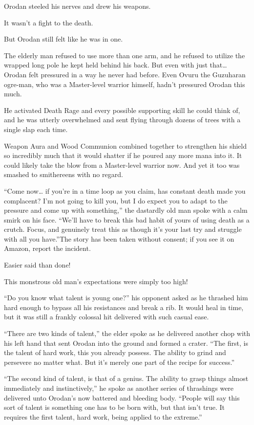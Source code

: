 \documentclass[a4paper,10pt]{book}
\begin{document}
Orodan steeled his nerves and drew his weapons.\par
\par
It wasn’t a fight to the death.\par
But Orodan still felt like he was in one.\par
The elderly man refused to use more than one arm, and he refused to utilize the wrapped long pole he kept held behind his back. But even with just that… Orodan felt pressured in a way he never had before. Even Ovuru the Guzuharan ogre-man, who was a Master-level warrior himself, hadn’t pressured Orodan this much.\par
He activated Death Rage and every possible supporting skill he could think of, and he was utterly overwhelmed and sent flying through dozens of trees with a single slap each time.\par
Weapon Aura and Wood Communion combined together to strengthen his shield so incredibly much that it would shatter if he poured any more mana into it. It could likely take the blow from a Master-level warrior now. And yet it too was smashed to smithereens with no regard.\par
“Come now… if you're in a time loop as you claim, has constant death made you complacent? I’m not going to kill you, but I do expect you to adapt to the pressure and come up with something,” the dastardly old man spoke with a calm smirk on his face. “We’ll have to break this bad habit of yours of using death as a crutch. Focus, and genuinely treat this as though it’s your last try and struggle with all you have.”The story has been taken without consent; if you see it on Amazon, report the incident.\par
Easier said than done!\par
This monstrous old man’s expectations were simply too high!\par
“Do you know what talent is young one?” his opponent asked as he thrashed him hard enough to bypass all his resistances and break a rib. It would heal in time, but it was still a frankly colossal hit delivered with such casual ease.\par
“There are two kinds of talent,” the elder spoke as he delivered another chop with his left hand that sent Orodan into the ground and formed a crater. “The first, is the talent of hard work, this you already possess. The ability to grind and persevere no matter what. But it’s merely one part of the recipe for success.”\par
“The second kind of talent, is that of a genius. The ability to grasp things almost immediately and instinctively,” he spoke as another series of thrashings were delivered unto Orodan’s now battered and bleeding body. “People will say this sort of talent is something one has to be born with, but that isn’t true. It requires the first talent, hard work, being applied to the extreme.”\par
\end{document}
